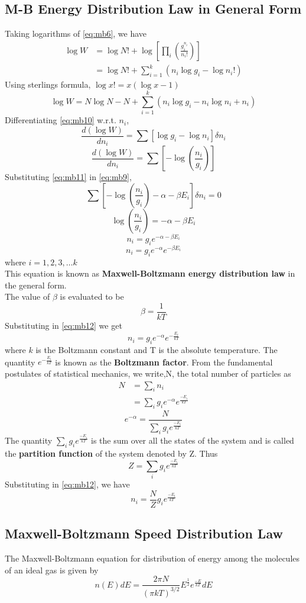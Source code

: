 \documentclass{article}
\numberwithin{equation}{section}
\begin{document}
\subsection{M-B Energy Distribution Law in General Form}
Taking logarithms of \eqref{eq:mb6}, we have
\begin{align*}
  \log W &= \log N! + \log \left[\prod_i \left(\frac{g_i^{n_i}}{n_i!}\right)\right]\\
  &= \log N! + \sum_{i=1}^{k} \left(n_i \log g_i - \log n_i!\right)
\end{align*}
Using sterlings formula, $\log x! = x(\log x - 1)$
\begin{equation}
  \log W = N \log N - N + \sum_{i=1}^{k}(n_i \log g_i - n_i \log n_i + n_i) \label{eq:mb10}
\end{equation}
Differentiating \eqref{eq:mb10} w.r.t. $n_i$,
$$\frac{d(\log W)}{dn_i} = \sum\left[\log g_i - \log n_i\right]\delta n_i$$
\begin{equation}
  \frac{d(\log W)}{dn_i} = \sum\left[-\log\left(\frac{n_i}{g_i}\right)\right]\label{eq:mb11}
\end{equation}
Substituting \eqref{eq:mb11} in \eqref{eq:mb9},
$$\sum\left[-\log\left(\frac{n_i}{g_i}\right) - \alpha - \beta E_i\right]\delta n_i = 0$$
$$\log\left(\frac{n_i}{g_i}\right) = -\alpha -\beta E_i$$
$$n_i = g_i e^{-\alpha-\beta E_i}$$
\begin{equation}
  n_i = g_i e^{-\alpha} e^{-\beta E_i} \label{eq:mb12}
\end{equation}
where $i=1,2,3,\dots k$\\
This equation is known as \textbf{Maxwell-Boltzmann energy distribution law} in the general form.\\
The value of $\beta$ is evaluated to be
$$\beta = \frac{1}{kT}$$
Substituting in \eqref{eq:mb12} we get
$$n_i = g_i e^{-\alpha} e^{-\frac{E_i}{kT}}$$
where $k$ is the Boltzmann  constant and T is the absolute temperature. The quantity $e^{-\frac{E_i}{kT}}$ is known as the \textbf{Boltzmann factor}.
From the fundamental postulates of statistical mechanics, we write,N, the total number of particles as
\begin{align*}
  N &= \sum_i n_i\\
  &= \sum_i g_i e^{-\alpha} e^{\frac{-E_i}{kT}}
\end{align*}
\begin{equation}
  e^{-\alpha} = \frac{N}{\sum_i g_i e^{\frac{-E_i}{kT}}} \label{eq:mb13}
\end{equation}
The quantity $\sum_i g_i e^{\frac{-E_i}{kT}}$ is the sum over all the states of the system and is called the \textbf{partition function} of the system denoted by Z. Thus
$$Z = \sum_i g_i e^{\frac{-E_i}{kT}}$$
Substituting in \eqref{eq:mb12}, we have
$$n_i = \frac{N}{Z} g_i e^{\frac{-E_i}{kT}}$$
\subsection{Maxwell-Boltzmann Speed Distribution Law}
The Maxwell-Boltzmann equation for distribution of energy among the molecules of an ideal gas is given by
$$n(E) dE = \frac{2\pi N}{(\pi kT)^{3/2}} E^{\frac{1}{2}} e^{\frac{-E}{kT}}dE$$
\end{document}
